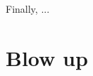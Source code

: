 \documentclass[12pt]{article}
\theoremstyle{definition}
\theoremstyle{plain}
\newcommand{\dif}{\mathrm{d}} %
\begin{document}
Finally, ...





\section{Blow up}


\end{document}
